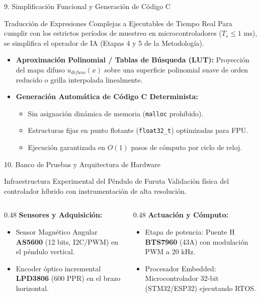 \documentclass[10pt,aspectratio=169]{beamer}
\begin{document}
\begin{frame}{9. Simplificación Funcional y Generación de Código C}
  \begin{block}{Traducción de Expresiones Complejas a Ejecutables de Tiempo Real}
    Para cumplir con los estrictos períodos de muestreo en microcontroladores ($T_s \le 1\text{ ms}$), se simplifica el operador de IA (Etapas 4 y 5 de la Metodología).
  \end{block}

  \begin{itemize}
    \item \textbf{Aproximación Polinomial / Tablas de Búsqueda (LUT):} Proyección del mapa difuso $u_{difuso}(x)$ sobre una superficie polinomial suave de orden reducido o grilla interpolada linealmente.
    \item \textbf{Generación Automática de Código C Determinista:}
      \begin{itemize}
        \item Sin asignación dinámica de memoria (\texttt{malloc} prohibido).
        \item Estructuras fijas en punto flotante (\texttt{float32\_t}) optimizadas para FPU.
        \item Ejecución garantizada en $O(1)$ pasos de cómputo por ciclo de reloj.
      \end{itemize}
  \end{itemize}
\end{frame}

\begin{frame}{10. Banco de Pruebas y Arquitectura de Hardware}
  \begin{block}{Infraestructura Experimental del Péndulo de Furuta}
    Validación física del controlador híbrido con instrumentación de alta resolución.
  \end{block}

  \begin{columns}[T]
    \begin{column}{0.48\textwidth}
      \textbf{Sensores y Adquisición:}
      \begin{itemize}
        \item Sensor Magnético Angular \textbf{AS5600} (12 bits, I2C/PWM) en el péndulo vertical.
        \item Encoder óptico incremental \textbf{LPD3806} (600 PPR) en el brazo horizontal.
      \end{itemize}
    \end{column}
    \begin{column}{0.48\textwidth}
      \textbf{Actuación y Cómputo:}
      \begin{itemize}
        \item Etapa de potencia: Puente H \textbf{BTS7960} (43A) con modulación PWM a 20 kHz.
        \item Procesador Embedded: Microcontrolador 32-bit (STM32/ESP32) ejecutando RTOS.
      \end{itemize}
    \end{column}
  \end{columns}
\end{frame}
\end{document}
